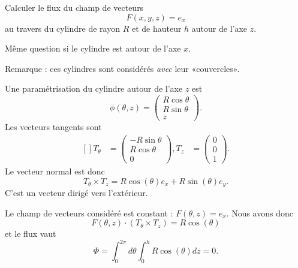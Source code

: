 \begin{example}     \label{EXooAJRLooSTPChN}

    Calculer le flux du champ de vecteurs
    \begin{equation}
        F(x,y,z)=e_x
    \end{equation}
    au travers du cylindre de rayon $R$ et de hauteur $h$ autour de l'axe $z$.

    Même question si le cylindre est autour de l'axe $x$.

Remarque : ces cylindres sont considérés \emph{avec} leur «couvercles».


    Une paramétrisation du cylindre autour de l'axe $z$ est
    \begin{equation}
        \phi(\theta,z)=\begin{pmatrix}
            R\cos\theta    \\
            R\sin\theta    \\
            z
        \end{pmatrix}.
    \end{equation}
    Les vecteurs tangents sont
    \begin{equation}
        \begin{aligned}[]
            T_{\theta}&=\begin{pmatrix}
                -R\sin\theta    \\
                R\cos\theta    \\
                0
            \end{pmatrix},
            T_z&=\begin{pmatrix}
                0    \\
                0    \\
                1
            \end{pmatrix}.
        \end{aligned}
    \end{equation}
    Le vecteur normal est donc
    \begin{equation}
        T_{\theta}\times T_z=R\cos(\theta)e_x+R\sin(\theta)e_y.
    \end{equation}
    C'est un vecteur dirigé vers l'extérieur.

    Le champ de vecteurs considéré est constant : $F(\theta,z)=e_x$. Nous avons donc
    \begin{equation}
        F(\theta,z)\cdot(T_{\theta}\times T_z)=R\cos(\theta)
    \end{equation}
    et le flux vaut
    \begin{equation}
        \Phi=\int_0^{2\pi}d\theta\int_0^hR\cos(\theta)dz=0.
    \end{equation}


\end{example}
